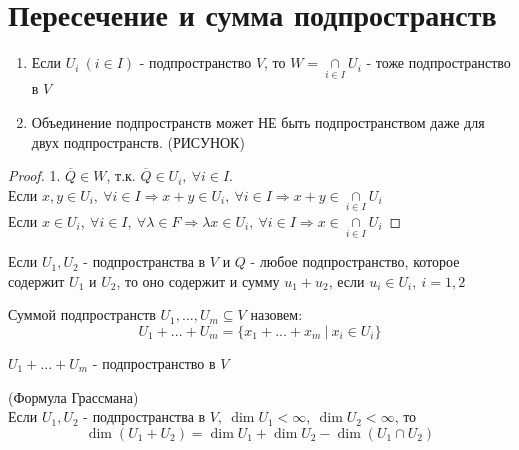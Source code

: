 \section{Пересечение и сумма подпространств}
  \begin{subtheorem}\tab
    \begin{enumerate}
      \item Если $U_i \ (i\in I)$ - подпространство $V$, то $W = \underset{i\in I}{\cap}U_i$ - тоже подпространство в $V$
      \item Объединение подпространств может НЕ быть подпространством даже для двух подпространств.
      (РИСУНОК)
    \end{enumerate}
  \end{subtheorem} 
  \begin{proof}
    1. $\overline{Q} \in W$, т.к. $\overline{Q} \in U_i, \ \forall i\in I$. \vspace{0.2cm}\\
    Если $x,y \in U_i, \ \forall i\in I \Longrightarrow x+y \in U_i, \ \forall i\in I \Longrightarrow x+y \in \underset{i\in I}{\cap}U_i$ \vspace{0.15cm}\\
    Если $x \in U_i, \ \forall i\in I, \ \forall \lambda \in F \Longrightarrow \lambda x \in U_i, \ \forall i\in I \Longrightarrow x \in \underset{i\in I}{\cap}U_i$  
  \end{proof}
  \begin{remark}
    Если $U_1, U_2$ - подпространства в $V$ и $Q$ - любое подпространство, которое содержит $U_1$ и $U_2$, то оно содержит и сумму $u_1+u_2$, если $u_i \in U_i, \ i =1,2$       
  \end{remark}
  \begin{remark}
    Суммой подпространств $U_1,...,U_m \subseteq V$ назовем: $$U_1 + ... + U_m = \{x_1+...+x_m \ | \ x_i \in U_i\}$$   
  \end{remark}
  \begin{subtheorem}
    $U_1 + ... + U_m$ - подпространство в $V$  
  \end{subtheorem}
  \begin{theorem} (Формула Грассмана)\\
    Если $U_1,U_2$ - подпространства в $V, \ \dim U_1 < \infty, \ \dim U_2 < \infty$, то 
    $$\dim (U_1+U_2) = \dim U_1 + \dim U_2 - \dim (U_1 \cap U_2)$$   
  \end{theorem}
